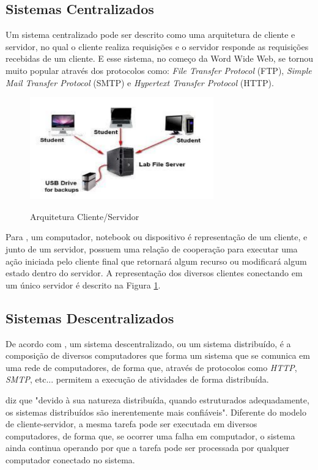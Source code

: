 \subsection{Sistemas Centralizados}

Um sistema centralizado pode ser descrito como uma arquitetura de cliente e servidor, no qual o cliente realiza requisições e o servidor responde as requisições recebidas de um cliente. E esse sistema, no começo da Word Wide Web, se tornou muito popular através dos protocolos como: \textit{File Transfer Protocol} (FTP), \textit{Simple Mail Transfer Protocol} (SMTP)
e \textit{Hypertext Transfer Protocol} (HTTP). \cite{client_server_model}

\begin{figure}[h!]
  \centering
  \caption{Arquitetura Cliente/Servidor}
  \includegraphics[width=300px]{src/images/client-server.png}
  \label{fig:client_server_fig}
\end{figure}

Para \citeauthor{held2000server}, um computador, notebook ou dispositivo é representação de um cliente, e junto de um servidor, possuem uma relação de cooperação para executar uma ação iniciada pelo cliente final que retornará algum recurso ou modificará algum estado dentro do servidor. A representação dos diversos clientes conectando em um único servidor é descrito na Figura \ref{fig:client_server_fig}.

\subsection{Sistemas Descentralizados}

De acordo com \cite{distributed}, um sistema descentralizado, ou um sistema distribuído, é a composição de diversos computadores que forma um sistema que se comunica em uma rede de computadores, de forma que, através de protocolos como \textit{HTTP}, \textit{SMTP}, etc... permitem a execução de atividades de forma distribuída.

\cite[p.17]{design_distributed_systems} diz que "devido à sua natureza distribuída, quando estruturados adequadamente, os sistemas distribuídos são inerentemente mais confiáveis". Diferente do modelo de cliente-servidor, a mesma tarefa pode ser executada em diversos computadores, de forma que, se ocorrer uma falha em computador, o sistema ainda continua operando por que a tarefa pode ser processada por qualquer computador conectado no sistema.

